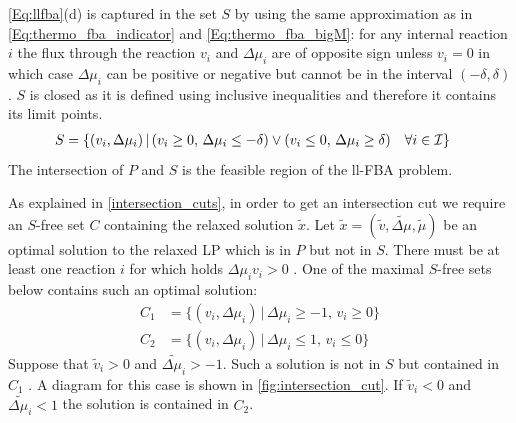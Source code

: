 \cref{Eq:llfba}(d) is captured in the set $S$ by using the same approximation as in \cref{Eq:thermo_fba_indicator} and \cref{Eq:thermo_fba_bigM}:
for any internal reaction $i$ the flux through the reaction $v_i$ and $\Delta \mu_i$ are of opposite sign unless $v_i=0$ in which case $\Delta \mu_i$ can be positive or negative but cannot be in the interval $(- \delta, \delta)$. $S$ is closed as it is defined using inclusive inequalities and therefore it contains its limit points. 
\begin{align*}
    \centering
    S &= \{(v_i, \Delta\mu_i) \, | \, (v_i \geq 0, \, \Delta \mu_i \leq - \delta) \lor (v_i \leq 0, \, \Delta \mu_i \geq \delta) \quad \forall i \in \mathcal{I}\}
\end{align*}
The intersection of $P$ and $S$ is the feasible region of the ll-FBA problem. 

As explained in \cref{intersection_cuts}, in order to get an intersection cut we require an $S$-free set $C$ containing the relaxed solution $\tilde x$. Let $\tilde x = (\tilde v, \tilde {\Delta \mu}, \tilde \mu)$ be an optimal solution to the relaxed LP which is in $P$ but not in $S$. There must be at least one reaction $i$ for which holds $\Delta \mu_i v_i > 0$ . One of the maximal $S$-free sets below contains such an optimal solution:
\begin{align*}
    C_1 &= \{(v_i, \Delta\mu_i) \, | \, \Delta \mu_i \geq -1, \, v_i \geq 0\} \\
    C_2 &= \{(v_i, \Delta\mu_i) \, | \, \Delta \mu_i \leq 1, \, v_i \leq 0\} %
\end{align*}
Suppose that $\tilde v_i > 0$ and $\tilde{\Delta \mu_i} > -1$. Such a solution is not in $S$ but contained in $C_1$ . A diagram for this case is shown in \cref{fig:intersection_cut}. If $\tilde v_i < 0$ and $\tilde{\Delta \mu_i} < 1$ the solution is contained in $C_2$.

